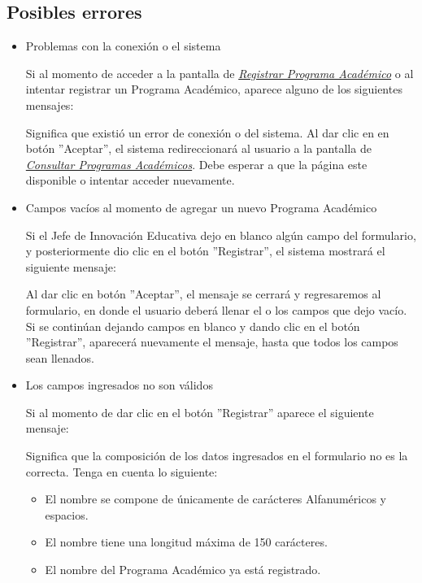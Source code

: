         \subsection{Posibles errores}
            \begin{itemize}

                \item Problemas con la conexión o el sistema

                    Si al momento de acceder a la pantalla de \hyperlink{registrarpa}{\textit{Registrar Programa Académico}} o al intentar registrar un Programa Académico, aparece alguno de los siguientes mensajes:

                    Significa que existió un error de conexión o del sistema. Al dar clic en en botón ''Aceptar'', el sistema redireccionará al usuario a la pantalla de \hyperlink{consultarpa}{\textit{Consultar Programas Académicos}}. Debe esperar a que la página este disponible o intentar acceder nuevamente.

                \item Campos vacíos al momento de agregar un nuevo Programa Académico

                    Si el Jefe de Innovación Educativa dejo en blanco algún campo del formulario, y posteriormente dio clic en el botón ''Registrar'', el sistema mostrará el siguiente mensaje:

                    Al dar clic en botón ''Aceptar'', el mensaje se cerrará y regresaremos al formulario, en donde el usuario deberá llenar el o los campos que dejo vacío. Si se continúan dejando campos en blanco y dando clic en el botón ''Registrar'', aparecerá nuevamente el mensaje, hasta que todos los campos sean llenados.\\


                \item Los campos ingresados no son válidos

                    Si al momento de dar clic en el botón ''Registrar'' aparece el siguiente mensaje:

                    Significa que la composición de los datos ingresados en el formulario no es la correcta. Tenga en cuenta lo siguiente:

                    \begin{itemize}
                        \item El nombre se compone de únicamente de carácteres Alfanuméricos y espacios.

                        \item El nombre tiene una longitud máxima de 150 carácteres.
                        
                        \item El nombre del Programa Académico ya está registrado.
                    \end{itemize}

            \end{itemize}

